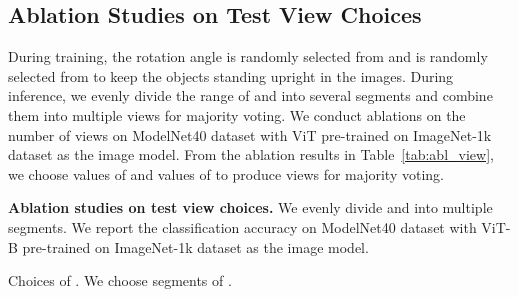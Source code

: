 \documentclass{article}
\begin{document}
\subsection{Ablation Studies on Test View Choices}

During training, the rotation angle  is randomly selected from  and  is randomly selected from  to keep the objects standing upright in the images. During inference, we evenly divide the range of  and  into several segments and combine them into multiple views for majority voting. We conduct ablations on the number of views on ModelNet40 dataset with ViT pre-trained on ImageNet-1k dataset as the image model. From the ablation results in Table~\ref{tab:abl_view}, we choose  values of  and  values of  to produce  views for majority voting. 

\begin{table}[t]
\caption{\small \textbf{Ablation studies on test view choices.} We evenly divide  and  into multiple segments. We report the classification accuracy on ModelNet40 dataset with ViT-B pre-trained on ImageNet-1k dataset as the image model.} 
\label{tab:abl_view}
\centering
\begin{subtable}{0.48\textwidth}
  \setlength\tabcolsep{4pt}
  \centering
  \caption{\footnotesize Choices of . We choose  segments of .}
  \label{tab:abl_viewtheta}
 \end{subtable}
  \hfill
\begin{subtable}{0.48\textwidth}
  \setlength\tabcolsep{4pt}
  \centering
  \caption{\footnotesize Choices of . We choose  segments of .}
  \label{tab:abl_viewphi}
 \end{subtable}
\end{table}
\end{document}
